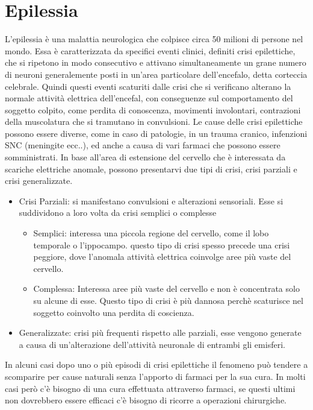 \documentclass{article}
\begin{document}
\section{Epilessia}
L'epilessia è una malattia neurologica che colpisce circa 50 milioni di persone nel mondo. Essa è caratterizzata da specifici eventi clinici, definiti crisi epilettiche, che si ripetono in modo consecutivo e attivano simultaneamente un grane numero di neuroni generalemente posti in un'area particolare dell'encefalo, detta corteccia celebrale. Quindi questi eventi scaturiti dalle crisi che si verificano alterano la normale attività elettrica dell'encefal, con conseguenze sul comportamento del soggetto colpito, come perdita di conoscenza, movimenti involontari, contrazioni della muscolatura che si tramutano in convulsioni.
Le cause delle crisi epilettiche possono essere diverse, come in caso di patologie, in un trauma cranico, infenzioni SNC (meningite ecc..), ed anche a causa di vari farmaci che possono essere somministrati.
In base all'area di estensione del cervello che è interessata da scariche elettriche anomale, possono presentarvi due tipi di crisi, crisi parziali e crisi generalizzate.
\begin{itemize}
\item Crisi Parziali:  si manifestano convulsioni e alterazioni sensoriali. Esse si suddividono a loro volta da crisi semplici o complesse 
\begin{itemize}
\item Semplici: interessa una piccola regione del cervello, come il lobo temporale o l'ippocampo. questo tipo di crisi spesso precede una crisi peggiore, dove l'anomala attività elettrica coinvolge aree più vaste del cervello.
\item Complessa: Interessa aree più vaste del cervello e non è concentrata solo su alcune di esse. Questo tipo di crisi è più dannosa perchè scaturisce nel soggetto coinvolto una perdita di coscienza.
\end{itemize}
\item Generalizzate: crisi più frequenti rispetto alle parziali, esse vengono generate a causa di un'alterazione dell'attività neuronale di  entrambi gli emisferi.
\end{itemize}
 In alcuni casi dopo uno o più episodi di crisi epilettiche il fenomeno può tendere a scomparire per cause naturali senza l'apporto di farmaci per la sua cura. In molti casi però c'è bisogno di una cura effettuata attraverso farmaci, se questi ultimi non dovrebbero essere efficaci c'è bisogno di ricorre a operazioni chirurgiche.
\end{document}
